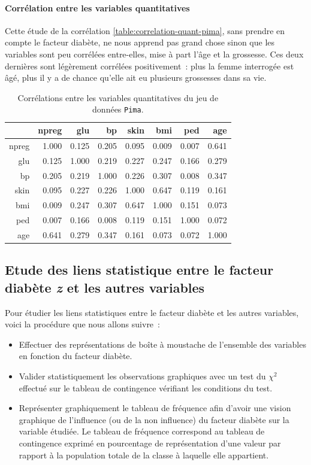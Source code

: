 \documentclass[a4paper,11pt]{report}
\begin{document}
\paragraph{Corrélation entre les variables quantitatives}

Cette étude de la corrélation \autoref{table:correlation-quant-pima}, sans prendre en compte le facteur diabète, ne nous apprend pas grand chose sinon que les variables sont peu corrélées entre-elles, mise à part l'âge et la grossesse. Ces deux dernières sont légèrement corrélées positivement~: plus la femme interrogée est âgé, plus il y a de chance qu'elle ait eu plusieurs grossesses dans sa vie.


\begin{table}[H]
	\centering
	\captionsetup{justification=centering, margin=4cm}
	\caption{Corrélations entre les variables quantitatives du jeu de données \texttt{Pima}.}
	\begin{tabular}{r|rrrrrrr}
		& npreg & glu & bp & skin & bmi & ped & age \\ 
		\hline
		npreg & 1.000 & 0.125 & 0.205 & 0.095 & 0.009 & 0.007 & 0.641 \\ 
		glu & 0.125 & 1.000 & 0.219 & 0.227 & 0.247 & 0.166 & 0.279 \\ 
		bp & 0.205 & 0.219 & 1.000 & 0.226 & 0.307 & 0.008 & 0.347 \\ 
		skin & 0.095 & 0.227 & 0.226 & 1.000 & 0.647 & 0.119 & 0.161 \\ 
		bmi & 0.009 & 0.247 & 0.307 & 0.647 & 1.000 & 0.151 & 0.073 \\ 
		ped & 0.007 & 0.166 & 0.008 & 0.119 & 0.151 & 1.000 & 0.072 \\ 
		age & 0.641 & 0.279 & 0.347 & 0.161 & 0.073 & 0.072 & 1.000 \\ 
	\end{tabular}
	\label{table:correlation-quant-pima}
\end{table}


\subsection{Etude des liens statistique entre le facteur diabète \textit{z} et les autres variables}

Pour étudier les liens statistiques entre le facteur diabète et les autres variables, voici la procédure que nous allons suivre~:
\begin{itemize}
	\item Effectuer des représentations de boîte à moustache de l'ensemble des variables en fonction du facteur diabète.
	\item Valider statistiquement les observations graphiques avec un test du $\chi^2$ effectué sur le tableau de contingence vérifiant les conditions du test.
	\item Représenter graphiquement le tableau de fréquence afin d'avoir une vision graphique de l'influence (ou de la non influence) du facteur diabète sur la variable étudiée. Le tableau de fréquence correspond au tableau de contingence exprimé en pourcentage de représentation d'une valeur par rapport à la population totale de la classe à laquelle elle appartient.
\end{itemize}
\end{document}
